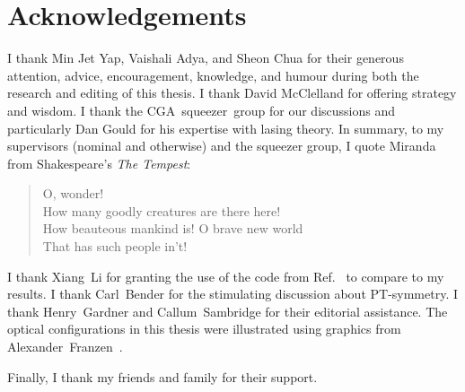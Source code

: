 \chapter*{Acknowledgements}

I thank Min Jet Yap, Vaishali Adya, and Sheon Chua for their generous attention, advice, encouragement, knowledge, and humour during both the research and editing of this thesis.
I thank David McClelland for offering strategy and wisdom.
I thank the CGA~squeezer~group for our discussions and particularly Dan Gould for his expertise with lasing theory. %
In summary, to my supervisors (nominal and otherwise) and the squeezer group, I quote Miranda from Shakespeare's \emph{The Tempest}:
\begin{quote}
O, wonder! \\ How many goodly creatures are there here! \\ How beauteous mankind is! O brave new world \\ That has such people in't!
\end{quote}

I thank Xiang~Li for granting the use of the code from Ref.~\cite{liBroadbandSensitivityImprovement2020} to compare to my results. I thank Carl~Bender for the stimulating discussion about PT-symmetry.
I thank Henry~Gardner and Callum~Sambridge for their editorial assistance.
The optical configurations in this thesis were illustrated using graphics from Alexander~Franzen~\cite{ComponentLibrary}.

Finally, I thank my friends and family for their support.


